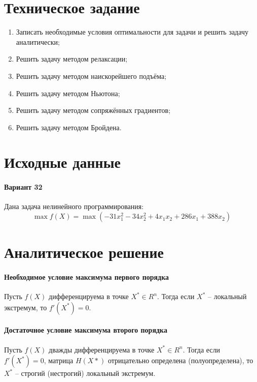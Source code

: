 





\tableofcontents
\listoffigures
\listoftables
\newpage

\section{Техническое задание}

\begin{enumerate}
	\setlength{\itemsep}{0em}
	\item Записать необходимые условия оптимальности для задачи и решить задачу аналитически;
	\item Решить задачу методом релаксации;
	\item Решить задачу методом наискорейшего подъёма;
	\item Решить задачу методом Ньютона;
	\item Решить задачу методом сопряжённых градиентов;
	\item Решить задачу методом Бройдена.
\end{enumerate}

\section{Исходные данные}

\paragraph{Вариант 32}

Дана задача нелинейного программирования:
\begin{equation}
	\label{eq:main}
	\max f(X) = \max \left( -31 x_1^2 - 34 x_2^2 + 4 x_1 x_2 + 286 x_1 + 388 x_2 \right)
\end{equation}

\section{Аналитическое решение}

\paragraph{Необходимое условие максимума первого порядка} Пусть $f(X)$ дифференцируема в точке $X^* \in R^n$. Тогда если $X^*$ -- локальный экстремум, то $f'(X^*) = 0$. 

\paragraph{Достаточное условие максимума второго порядка} Пусть $f(X)$ дважды дифференцируема в точке $X^* \in R^n$. Тогда если $f'(X^*) = 0$, матрица $H(X*)$ отрицательно определена (полуопределена), то $X^*$ -- строгий (нестрогий) локальный экстремум.\\

